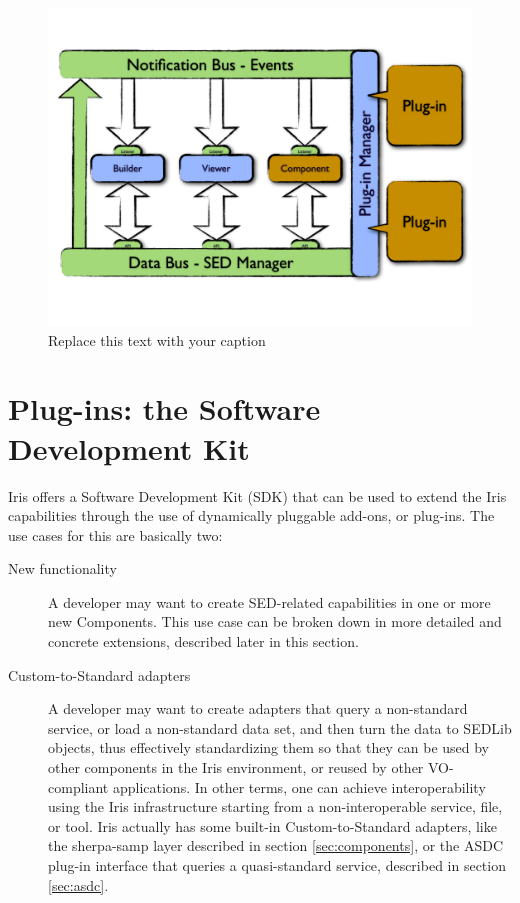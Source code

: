 \documentclass[preprint,12pt,3p]{elsarticle}
\begin{document}
\begin{figure}[h!]
\begin{center}
\includegraphics[width=0.7\columnwidth]{figures/IrisDiagrams.1/IrisDiagrams.1.png}
\caption{Replace this text with your caption}
\end{center}
\end{figure}

\section{Plug-ins: the Software Development Kit}
\label{sec:plugins}

Iris offers a Software Development Kit (SDK) that can be used to extend the Iris capabilities through the use of dynamically pluggable add-ons, or plug-ins.
The use cases for this are basically two:
\begin{description}
\item[New functionality] A developer may want to create SED-related capabilities in one or more new Components. This use case can be broken down in more detailed and concrete extensions, described later in this section.
\item[Custom-to-Standard adapters] A developer may want to create adapters that query a non-standard service, or load a non-standard data set, and then turn the data to SEDLib objects, thus effectively standardizing them so that they can be used by other components in the Iris environment, or reused by other VO-compliant applications. In other terms, one can achieve interoperability using the Iris infrastructure starting from a non-interoperable service, file, or tool. Iris actually has some built-in Custom-to-Standard adapters, like the sherpa-samp layer described in section \ref{sec:components}, or the ASDC plug-in interface that queries a quasi-standard service, described in section \ref{sec:asdc}.
\end{description}
\end{document}
